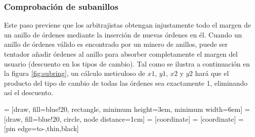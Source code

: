 \documentclass[UTF8,nofonts]{article}
\makeatletter
\newenvironment{figurehere}
 {\def\@captype{figure}}
 {}
\makeatother
\begin{document}
\begin{multicols}{2}
\subsubsection{Comprobación de subanillos\label{sec:sub_ring_check}}
Este paso previene que los arbitrajistas obtengan injustamente todo el margen de un anillo de órdenes mediante la inserción de nuevas órdenes en él. Cuando un anillo de órdenes válido es encontrado por un minero de anillos, puede ser tentador añadir órdenes al anillo para absorber completamente el margen del usuario (descuento en los tipos de cambio). Tal como se ilustra a continuación en la figura \ref{fig:subring}, un cálculo meticuloso de $x1$, $y1$, $x2$ y $y2$ hará que el producto del tipo de cambio de todas las órdenes sea exactamente 1, eliminando así el descuento. 

\begin{center}
\begin{figurehere}
\centering
{} = [draw, fill=blue!20, rectangle, 
    minimum height=3em, minimum width=6em]
 = [draw, fill=blue!20, circle, node distance=1cm]
 = [coordinate]
 = [coordinate]
 = [pin edge={to-,thin,black}]

\end{figurehere}
\end{center}
\end{multicols}
\end{document}
